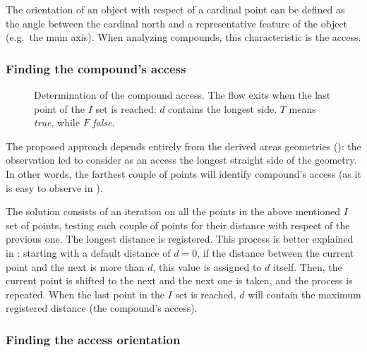             The orientation of an object with respect of a cardinal point can be defined as the angle between the cardinal north and a representative feature of the object (e.g.\ the main axis). When analyzing compounds, this characteristic is the access.

            \subsubsection{Finding the compound's access}

                \begin{wrapfigure}{r}{0.45\textwidth}
                    \centering
                    \begin{tikzpicture}[x=1mm,y=1mm,scale=0.005]
                        
                    \end{tikzpicture}
                    \caption[Logic process to determine the compound's access.]{Determination of the compound access. The flow exits when the last point of the $I$ set is reached: $d$ contains the longest side. $T$ means \emph{true}, while $F$ \emph{false}.}
                    \label{fig:flow-access}
                    \vspace{-0.08\textheight}
                \end{wrapfigure}

                The proposed approach depends entirely from the derived areas geometries (): the observation led to consider as an access the longest straight side of the geometry. In other words, the farthest couple of points will identify compound's access (as it is easy to observe in ).
                
                The solution consists of an iteration on all the points in the above mentioned $I$ set of points, testing each couple of points for their distance with respect of the previous one. The longest distance is registered. This process is better explained in : starting with a default distance of $d=0$, if the distance between the current point and the next is more than $d$, this value is assigned to $d$ itself. Then, the current point is shifted to the next and the next one is taken, and the process is repeated. When the last point in the $I$ set is reached, $d$ will contain the maximum registered distance (the compound's access).

            \subsubsection{Finding the access orientation}


